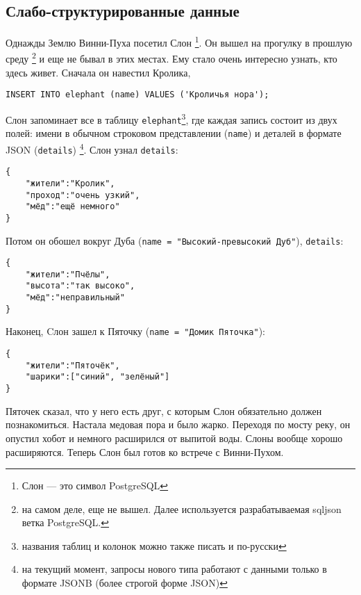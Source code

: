 \documentclass[10pt, a5paper]{article}
\begin{document}
\subsection*{Слабо-структурированные данные}
Однажды Землю Винни-Пуха посетил Слон
\footnote{Слон --- это символ PostgreSQL}.
Он вышел на прогулку в прошлую среду
\footnote{на самом деле, еще не вышел. Далее используется разрабатываемая sqljson ветка PostgreSQL.}
и еще не бывал в этих местах.
Ему стало очень интересно узнать, кто здесь живет.
Сначала он навестил Кролика,
\begin{verbatim}
INSERT INTO elephant (name) VALUES ('Кроличья нора'); 
\end{verbatim}
Слон запоминает все в таблицу 
\texttt{elephant}\footnote{названия таблиц и колонок можно также писать и по-русски},
где каждая запись состоит из двух полей: 
имени в обычном строковом представлении (\texttt{name})
и деталей в формате JSON (\texttt{details})
\footnote{на текущий момент, запросы нового типа работают с  данными только в формате JSONB (более строгой форме JSON)}.
Слон узнал \texttt{details}: 
\begin{verbatim}
{
    "жители":"Кролик",
    "проход":"очень узкий",
    "мёд":"ещё немного"
}
\end{verbatim}
Потом он обошел вокруг Дуба (\texttt{name = "Высокий-превысокий Дуб"}), \texttt{details}:
\begin{verbatim}
{
    "жители":"Пчёлы",
    "высота":"так высоко",
    "мёд":"неправильный"
}
\end{verbatim}
Наконец, Cлон зашел к Пяточку (\texttt{name = "Домик Пяточка"}):
\begin{verbatim}
{
    "жители":"Пяточёк",
    "шарики":["синий", "зелёный"]
}
\end{verbatim}
Пяточек сказал, что у него есть друг, с которым Слон обязательно должен познакомиться.
Настала медовая пора и было жарко.
Переходя по мосту реку, он опустил хобот и немного расширился от выпитой воды. 
Слоны вообще хорошо расширяются.
Теперь Слон был готов ко встрече с Винни-Пухом.
\end{document}

